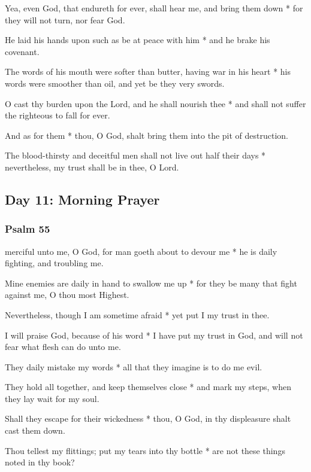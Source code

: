 Yea, even God, that endureth for ever, shall hear me, and bring them down * for they will not turn, nor fear God.

He laid his hands upon such as be at peace with him * and he brake his covenant.

The words of his mouth were softer than butter, having war in his heart * his words were smoother than oil, and yet be they very swords.

O cast thy burden upon the Lord, and he shall nourish thee * and shall not suffer the righteous to fall for ever.

And as for them * thou, O God, shalt bring them into the pit of destruction.

The blood-thirsty and deceitful men shall not live out half their days * nevertheless, my trust shall be in thee, O Lord.

\subsection{Day 11: Morning Prayer}

\subsubsection{Psalm 55}


 merciful unto me, O God, for man goeth about to devour me * he is daily fighting, and troubling me.

Mine enemies are daily in hand to swallow me up * for they be many that fight against me, O thou most Highest.

Nevertheless, though I am sometime afraid * yet put I my trust in thee.

I will praise God, because of his word * I have put my trust in God, and will not fear what flesh can do unto me.

They daily mistake my words * all that they imagine is to do me evil.

They hold all together, and keep themselves close * and mark my steps, when they lay wait for my soul.

Shall they escape for their wickedness * thou, O God, in thy displeasure shalt cast them down.

Thou tellest my flittings; put my tears into thy bottle * are not these things noted in thy book?

